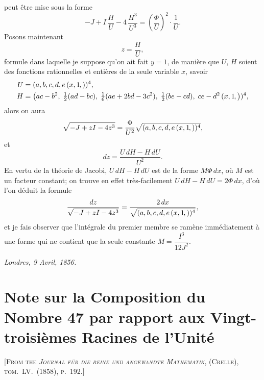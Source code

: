 \documentclass[11pt,a4paper]{article}
\newcommand{\fcn}[2]{(#1\kern-1pt, #2)}
\begin{document}
peut \^etre mise sous la forme
\[
-J + I\,\frac{H}{U} - 4\,\frac{H^3}{U^3} = \left(\frac{\Phi}{U}\right)^{\!2}\cdot\frac{1}{U}.
\]
Posons maintenant
\[
z = \frac{H}{U},
\]
formule dans laquelle je suppose qu'on ait fait $y = 1$, de mani\`ere que $U$, $H$
soient des fonctions rationnelles et enti\`eres de la seule variable $x$, savoir
\begin{align*}
U &= (a, b, c, d, e\,\fcn{x,1})^4,\\
H &= \big(ac - b^2,\; \tfrac{1}{2}(ad - bc),\; \tfrac{1}{6}(ae + 2 bd - 3 c^2),\; \tfrac{1}{2}(be - cd),\; ce - d^2 \,\fcn{x,1}\big)^4,
\end{align*}
alors on aura
\[
\sqrt{-J + zI - 4 z^3} = \frac{\Phi}{U^2}\sqrt{(a,b,c,d,e\,\fcn{x,1})^4},
\]
et
\[
dz = \frac{U\,dH - H\,dU}{U^2}.
\]
En vertu de la th\'eorie de Jacobi, $U\,dH - H\,dU$ est de la forme $M\Phi\,dx$, o\`u
$M$ est un facteur constant; on trouve en effet tr\`es-facilement
$U\,dH - H\,dU = 2 \Phi\,dx$, d'o\`u l'on d\'eduit la formule
\[
\frac{dz}{\sqrt{-J + zI - 4 z^3}} = \frac{2\,dx}{\sqrt{(a,b,c,d,e\,\fcn{x,1})^4}},
\]
et je fais observer que l'int\'egrale du premier membre se ram\`ene imm\'ediatement
\`a une forme qui ne contient que la seule constante $M = \dfrac{I^3}{12 J^2}$.

\medskip
\noindent\textit{Londres, 9 Avril, 1856.}

\newpage


\setcounter{page}{70}

\section*{Note sur la Composition du Nombre 47 par rapport aux Vingt-troisi\`emes Racines de l'Unit\'e}
\label{paper:236}

\textsc{[From the \textit{Journal f\"ur die reine und angewandte Mathematik}, (Crelle), tom.~LV.\ (1858), p.~192.]}

\medskip
\end{document}
